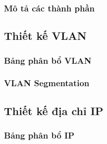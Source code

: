 \subsubsection{Mô tả các thành phần}

\subsection{Thiết kế VLAN}

\subsubsection{Bảng phân bổ VLAN}

\subsubsection{VLAN Segmentation}

\subsection{Thiết kế địa chỉ IP}

\subsubsection{Bảng phân bổ IP}

